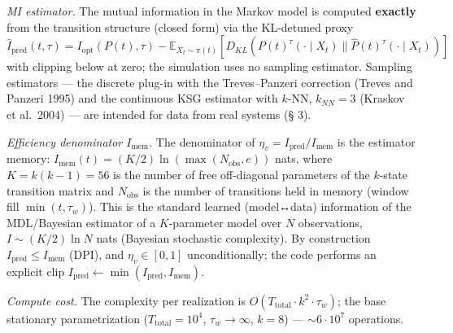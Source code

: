 \documentclass[pdflatex,sn-mathphys-ay]{sn-jnl}
\begin{document}
\emph{MI estimator.} The mutual information in the Markov model is computed \textbf{exactly} from the transition structure (closed form) via the KL-detuned proxy \(\widehat I_{\text{pred}}(t,\tau) = I_{\text{opt}}(P(t), \tau) - \mathbb{E}_{X_t \sim \pi(t)}[D_{KL}(P(t)^\tau(\cdot \mid X_t) \| \hat P(t)^\tau(\cdot \mid X_t))]\) with clipping below at zero; the simulation uses no sampling estimator. Sampling estimators --- the discrete plug-in with the Treves--Panzeri correction (Treves and Panzeri 1995) and the continuous KSG estimator with \(k\)-NN, \(k_{NN} = 3\) (Kraskov et al.~2004) --- are intended for data from real systems (§ 3).



\emph{Efficiency denominator \(I_{\text{mem}}\).} The denominator of \(\eta_v = I_{\text{pred}}/I_{\text{mem}}\) is the estimator memory: \(I_{\text{mem}}(t) = (K/2)\ln(\max(N_{\text{obs}}, e))\) nats, where \(K = k(k-1) = 56\) is the number of free off-diagonal parameters of the \(k\)-state transition matrix and \(N_{\text{obs}}\) is the number of transitions held in memory (window fill \(\min(t, \tau_w)\)). This is the standard learned (model↔data) information of the MDL/Bayesian estimator of a \(K\)-parameter model over \(N\) observations, \(I \sim (K/2)\ln N\) nats (Bayesian stochastic complexity). By construction \(I_{\text{pred}} \le I_{\text{mem}}\) (DPI), and \(\eta_v \in [0,1]\) unconditionally; the code performs an explicit clip \(I_{\text{pred}} \gets \min(I_{\text{pred}}, I_{\text{mem}})\).



\emph{Compute cost.} The complexity per realization is \(O(T_{\text{total}} \cdot k^2 \cdot \tau_w)\); the base stationary parametrization (\(T_{\text{total}} = 10^4\), \(\tau_w \to \infty\), \(k = 8\)) --- \(\sim 6 \cdot 10^7\) operations.
\end{document}
